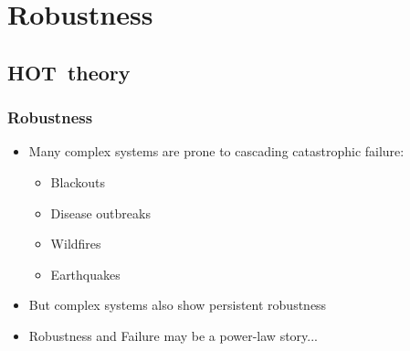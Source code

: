 




\section{Robustness}


\subsection{HOT\ theory}


\begin{frame}
  \frametitle{Robustness}

  \begin{block}{}
  \begin{itemize}
  \item<1-> Many complex systems are prone to cascading catastrophic failure: 
    \begin{itemize}
    \item<2-> 
      Blackouts
    \item<3-> 
      Disease outbreaks
    \item<4->
      Wildfires
    \item<5-> 
      Earthquakes
    \end{itemize}
  \item<7-> But complex systems also show persistent \alert{robustness}
  \item<9-> Robustness and Failure may be a power-law story...
  \end{itemize}
  \end{block}

\end{frame}


